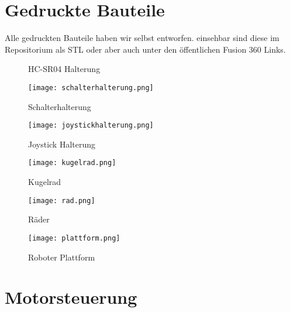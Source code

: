 \documentclass[12pt]{article}
\begin{document}
\newpage
\section{Gedruckte Bauteile} %

Alle gedruckten Bauteile haben wir selbst entworfen. einsehbar sind diese im Repositorium als STL oder aber auch unter den öffentlichen Fusion 360 Links.
\newline
\begin{figure}[h]
	\centering 
\caption{HC-SR04 Halterung} 
\end{figure}

\begin{figure}[h]
	\texttt{[image: schalterhalterung.png]}
	\centering
	\caption{Schalterhalterung \cite{Schalterhalterung}}
\end{figure} 

\begin{figure}
        \centering
        \begin{minipage}[t]{0.48\textwidth}
                \texttt{[image: joystickhalterung.png]}
                \caption{Joystick Halterung \cite{Joystick_Halterung}}
        \end{minipage}\hfill
        \begin{minipage}[t]{0.48\textwidth}
                \texttt{[image: kugelrad.png]}
                \caption{Kugelrad \cite{Kugelrad}}
        \end{minipage}
        \medskip

        \begin{minipage}[t]{0.48\textwidth}
                \texttt{[image: rad.png]}
                \caption{Räder \cite{Raeder}}
        \end{minipage}\hfill
        \begin{minipage}[t]{0.48\textwidth}
                \texttt{[image: plattform.png]}
                \caption{Roboter Plattform \cite{Plattform}}
        \end{minipage}
       
\end{figure}

\newpage
\section{Motorsteuerung} %
\end{document}
